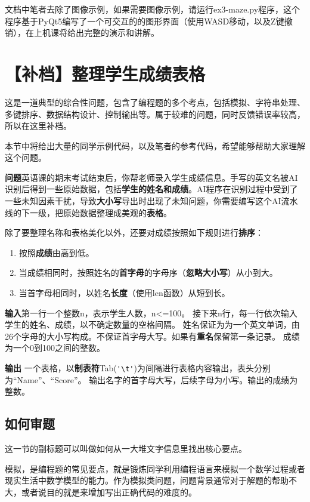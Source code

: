 \documentclass{article}
\begin{document}
文档中笔者去除了图像示例，如果需要图像示例，请运行ex3-maze.py程序，这个程序基于PyQt5编写了一个可交互的的图形界面（使用WASD移动，以及Z键撤销），在上机课将给出完整的演示和讲解。

\newpage
\section{【补档】整理学生成绩表格}

这是一道典型的综合性问题，包含了编程题的多个考点，包括模拟、字符串处理、多键排序、数据结构设计、控制输出等。属于较难的问题，同时反馈错误率较高，所以在这里补档。

本节中将给出大量的同学示例代码，以及笔者的参考代码，希望能够帮助大家理解这个问题。

\textbf{问题}\quad 英语课的期末考试结束后，你帮老师录入学生成绩信息。手写的英文名被AI识别后得到一些原始数据，包括\textbf{学生的姓名和成绩}。AI程序在识别过程中受到了一些未知因素干扰，导致\textbf{大小写}导出时出现了未知问题，你需要编写这个AI流水线的下一级，把原始数据整理成美观的\textbf{表格}。

除了要整理名称和表格美化以外，还要对成绩按照如下规则进行\textbf{排序}：
\begin{enumerate}
    \item 按照\textbf{成绩}由高到低。
    \item 当成绩相同时，按照姓名的\textbf{首字母}的字母序（\textbf{忽略大小写}）从小到大。
    \item 当首字母相同时，以姓名\textbf{长度}（使用len函数）从短到长。
\end{enumerate}

\textbf{输入}\quad 第一行一个整数n，表示学生人数，n<=100。
接下来n行，每一行依次输入学生的姓名、成绩，以不确定数量的空格间隔。
姓名保证为为一个英文单词，由26个字母的大小写构成。不保证首字母大写。如果有\textbf{重名}保留第一条记录。
成绩为一个0到100之间的整数。



\textbf{输出} 一个表格，以\textbf{制表符}Tab(\lstinline|'\t'|)为间隔进行表格内容输出，表头分别为“Name”、“Score”。
输出名字的首字母大写，后续字母为小写。输出的成绩为整数。

\subsection{如何审题}

这一节的副标题可以叫做如何从一大堆文字信息里找出核心要点。

模拟，是编程题的常见要点，就是锻炼同学利用编程语言来模拟一个数学过程或者现实生活中数学模型的能力。作为模拟类问题，问题背景通常对于解题的帮助不大，或者说目的就是来增加写出正确代码的难度的。
\end{document}
